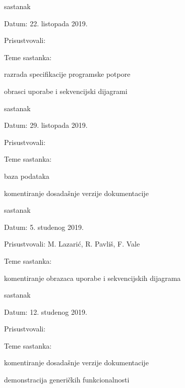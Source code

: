 \begin{packed_enum}
			\item  sastanak
			\item[] \begin{packed_item}
				\item Datum: 22. listopada 2019.
				\item Prisustvovali: \imenaSvihClanova
				\item Teme sastanka:
				\begin{packed_item}
					\item razrada specifikacije programske potpore
					\item obrasci uporabe i sekvencijski dijagrami
				\end{packed_item}
			\end{packed_item}
		
			\item  sastanak
			\item[] \begin{packed_item}
				\item Datum: 29. listopada 2019.
				\item Prisustvovali: \imenaSvihClanova
				\item Teme sastanka:
				\begin{packed_item}
					\item baza podataka
					\item komentiranje dosadašnje verzije dokumentacije
				\end{packed_item}
			\end{packed_item}
		
			\item  sastanak
			\item[] \begin{packed_item}
				\item Datum: 5. studenog 2019.
				\item Prisustvovali: M. Lazarić, R. Pavliš, F. Vale
				\item Teme sastanka:
				\begin{packed_item}
					\item komentiranje obrazaca uporabe i sekvencijskih dijagrama
				\end{packed_item}
			\end{packed_item}
		
			\item  sastanak
			\item[] \begin{packed_item}
				\item Datum: 12. studenog 2019.
				\item Prisustvovali: \imenaSvihClanova
				\item Teme sastanka:
				\begin{packed_item}
					\item komentiranje dosadašnje verzije dokumentacije
					\item demonstracija generičkih funkcionalnosti
				\end{packed_item}
			\end{packed_item}
			

\end{packed_enum}
